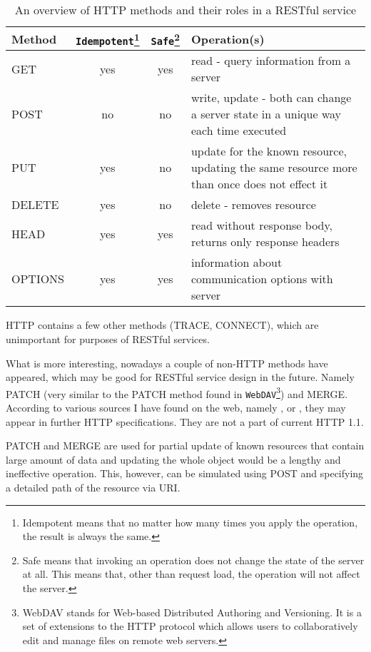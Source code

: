 	\begin{table}[h]\centering
	 	\begin{minipage}{12.9cm}
		\begin{tabular}{l|c|c|p{6cm}}
		\hline
		Method & \verb|Idempotent|\footnote{Idempotent means that no matter how many times you apply the operation, 
		the result is always the same.} & \verb|Safe|\footnote{Safe means that invoking an operation does not change the 
		state of the server at all. This means that, other than request load, the operation will not affect the server.} 
		& Operation(s)\\
		\hline
		GET & yes & yes & read - query information from a server\\
		POST & no & no & write, update - both can change a server state in a unique way each time executed\\
		PUT & yes & no & update for the known resource, updating the same resource more than once does not effect it\\
		DELETE & yes & no & delete - removes resource\\
		HEAD & yes & yes & read without response body, returns only response headers\\
		OPTIONS & yes & yes & information about communication options with server\\
		\end{tabular}
	    \renewcommand{\footnoterule}{}
	    \end{minipage}
	\caption{An overview of HTTP methods and their roles in a RESTful service}
	\label{http_methods}
	\end{table}
	
	HTTP contains a few other methods (TRACE, CONNECT), which are unimportant for purposes of RESTful services.
	
	What is more interesting, nowadays a couple of non-HTTP methods have appeared, which may be good for RESTful service
	design in the future. Namely PATCH (very similar to the PATCH method found in \verb|WebDAV|\footnote{WebDAV stands for
	Web-based Distributed Authoring and Versioning. It is a set of extensions to the HTTP protocol which allows users to 
	collaboratively edit and manage files on remote web servers.}) and MERGE. According to various sources I have found on
	the web, namely \cite{httppatch}, \cite{msdnpatchmerge} or \cite{rfc2616}, they may appear in further HTTP
	specifications. They are not a part of current HTTP 1.1.
	
	PATCH and MERGE are used for partial update of known resources that contain large amount of data and updating the whole
	object would be a lengthy and ineffective operation. This, however, can be simulated using POST and specifying a
	detailed path of the resource via URI.
	

